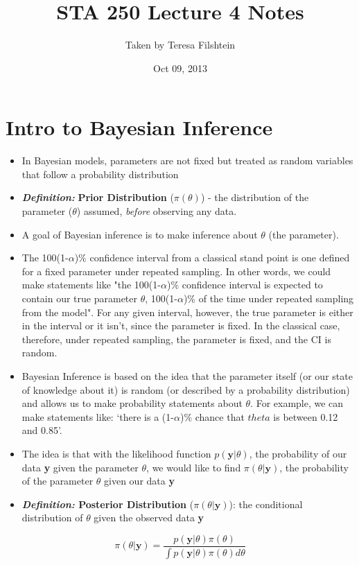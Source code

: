 \documentclass[]{article}
\title{STA 250 Lecture 4 Notes}
\author{Taken by Teresa Filshtein}
\date{Oct 09, 2013}
\begin{document}
\maketitle

\section{Intro to Bayesian Inference}
\begin{itemize}
	\item In Bayesian models, parameters are not fixed but treated as random variables that follow a probability distribution
	\item \textbf{\textit{Definition:}} \textbf{Prior Distribution} ($\pi(\theta)$) - the distribution of the parameter ($\theta$) assumed, \textit{before} observing any data. 
	\item A goal of Bayesian inference is to make inference about $\theta$ (the parameter).
	\item The 100(1-$\alpha$)$\%$ confidence interval from a classical stand point is one defined for a fixed parameter under repeated sampling. In other words, we could make statements like "the 100(1-$\alpha$)$\%$ confidence interval is expected to contain our true parameter $\theta$, 100(1-$\alpha$)$\%$ of the time under repeated sampling from the model". For any given interval, however, the true parameter is either in the interval or it isn't, since the parameter is fixed. In the
        classical case, therefore, under repeated sampling, the parameter is fixed, and the CI is random. 
    \item Bayesian Inference is based on the idea that the parameter itself (or our state of knowledge about it) is random (or described by a probability distribution) and allows us to make probability statements about $\theta$. For example, we can make statements like: \lq{}there is a (1-$\alpha$)$\%$ chance that $theta$ is between 0.12 and 0.85\rq{}. 
\item The idea is that with the likelihood function $p(\textbf{y}|\theta)$, the probability of our data \textbf{y} given the parameter $\theta$, we would like to find $\pi(\theta|\textbf{y})$, the probability of the parameter $\theta$ given our data \textbf{y}
\item \textbf{\textit{Definition:} Posterior Distribution} ($\pi(\theta|\textbf{y})$): the conditional distribution of $\theta$ given the observed data \textbf{y}
\end{itemize}
\begin{equation}
\pi(\theta|\textbf{y}) = \frac{p(\textbf{y}|\theta)\pi(\theta)}{\int{p(\textbf{y}|\theta)\pi(\theta)d\theta}}
\label{prior}
\end{equation}
\end{document}
